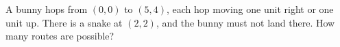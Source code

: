 A bunny hops from $(0,0)$ to $(5,4)$, each hop moving one unit right or one unit up. There is a snake at $(2,2)$, and the bunny must not land there. How many routes are possible?
